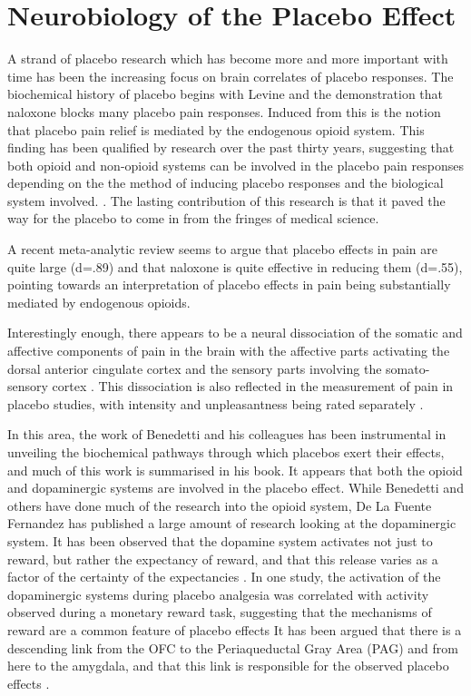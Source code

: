 \section{Neurobiology of the Placebo Effect}
\label{sec:neur-plac-effect}

A strand of placebo research which has become more and more important with time has been the increasing focus on brain correlates of placebo responses. The biochemical history of placebo begins with Levine \cite{Levine1978a} and the demonstration that naloxone blocks many placebo pain responses. Induced from this is the notion that placebo pain relief is mediated by the endogenous opioid system. This finding has been qualified by research over the past thirty years, suggesting that both opioid and non-opioid systems can be involved in the placebo pain responses depending on the the method of inducing placebo responses and the biological system involved. \cite{Amanzio2001,Benedetti2003a}. The lasting contribution of this research is that it paved the way for the placebo to come in from the fringes of medical science.

 A recent meta-analytic review \cite{Sauro2005} seems to argue that placebo effects in pain are quite large (d=.89) and that naloxone is quite effective in reducing them (d=.55), pointing towards an interpretation of placebo effects in pain being substantially mediated by endogenous opioids. 

Interestingly enough, there appears to be a neural dissociation of the somatic and affective components of pain in the brain with the affective parts activating the dorsal anterior cingulate cortex and the sensory parts involving the somato-sensory cortex \cite{Lieberman2004}. This dissociation is also reflected in the measurement of pain in placebo studies, with intensity and unpleasantness being rated separately \cite{Price2008}.

In this area, the work of Benedetti and his colleagues has been instrumental in unveiling the biochemical pathways through which placebos exert their effects, and much of this work is summarised in his book.  It appears that both the opioid and dopaminergic systems are involved in the placebo effect. While Benedetti and others have done much of the research into the opioid system, De La Fuente Fernandez \cite{DeLaFuente-Fernandez2002} has published a large amount of research looking at the dopaminergic system. It has been observed that the dopamine system activates not just to reward, but rather the expectancy of reward, and that this release varies as a factor of the certainty of the expectancies \cite{Scott2007}. In one study, the activation of the dopaminergic systems during placebo analgesia was correlated with activity observed during a monetary reward task, suggesting that the mechanisms of reward are a common feature of placebo effects \cite{Scott2007a}  It has been argued that there is a descending link from the OFC to the Periaqueductal Gray Area (PAG) and from here to the amygdala, and that this link is responsible for the observed placebo effects \cite{Fuente-Fernandez2002}.

